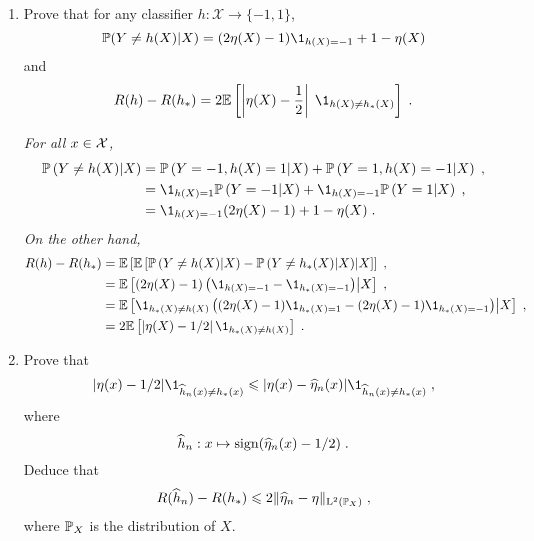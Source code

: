 \begin{enumerate}
\item Prove that for any classifier $h:\mathcal{X}\to \{-1,1\}$,
\[
\bP(Y\neq h(X)|X) = (2\eta(X)-1)\1_{h(X)=-1}+1-\eta(X)
\]
and
\[
R(h)-R(h_{*})=2\bE \left[\left|\eta(X)-\frac{1}{2}\right|\eqsp\1_{h(X)\neq h_*(X)}\right]\eqsp.
\]

\vspace{.2cm}

{\em
For all $x\in\mathcal{X}$,
\begin{align*}
\bP\left(Y \neq h(X) | X\right) & = \bP\left(Y=-1, h(X) = 1 |X\right) + \bP\left(Y=1, h(X) = -1 |X\right)\eqsp,\\
& = \1_{h(X) = 1} \bP\left(Y=-1 |X\right) + \1_{h(X) = -1} \bP\left(Y=1 |X\right)\eqsp,\\
& = \1_{h(X) = -1} (2\eta(X) - 1) + 1 - \eta(X)\eqsp.
\end{align*}
On the other hand,
\begin{align*}
R(h) - R(h_*) & = \bE\left[\bE\left[\bP\left(Y \neq h(X) | X\right) - \bP\left(Y \neq h_*(X) | X\right)\middle|X\right]\right]\eqsp,\\
& =  \bE\left[(2\eta(X)-1) \left(\1_{h(X) = -1} - \1_{h_*(X) = -1} \right)\middle|X\right]\eqsp,\\
& =  \bE\left[\1_{h_*(X) \neq h(X)} \left( (2\eta(X)-1) \1_{h_*(X)=1} - (2\eta(X)-1) \1_{h_*(X)=-1} \right)\middle|X\right]\eqsp,\\
& = 2\bE\left[\left| \eta(X) - 1/2 \right| \1_{h_*(X) \neq h(X)}\right]\eqsp.
\end{align*}
}
\item Prove that 
\[
|\eta(x)-1/2|\1_{\widehat h_n(x)\neq h_{*}(x)}\leqslant |\eta(x)-\widehat \eta_n(x)|\1_{\widehat h_n(x)\neq h_{*}(x)}\eqsp,
\]
where
\[
\widehat h_n:x \mapsto{\rm sign}(\widehat \eta_n(x)-1/2)\;.
\]
Deduce that 
\[
R(\widehat h_n)-R(h_*)\leqslant 2\|\widehat \eta_n-\eta\|_{\mathrm{L}^2(\mathbb{P}_X)}\;,
\]
where $\mathbb{P}_X$ is the distribution of $X$.
\vspace{.2cm}


\end{enumerate}

